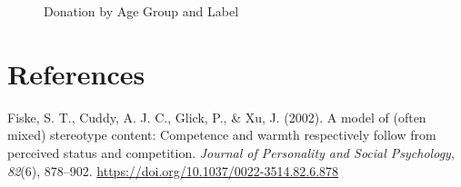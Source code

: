 \documentclass[
  man,
  floatsintext,
  longtable,
  nolmodern,
  notxfonts,
  notimes,
  colorlinks=true,linkcolor=blue,citecolor=blue,urlcolor=blue]{apa7}
\newlength{\cslhangindent}
\newenvironment{CSLReferences}[2] %
 {\begin{list}{}{%
  \setlength{\itemindent}{0pt}
  \setlength{\leftmargin}{0pt}
  \setlength{\parsep}{0pt}
  \ifodd #1
   \setlength{\leftmargin}{\cslhangindent}
   \setlength{\itemindent}{-1\cslhangindent}
  \fi
  \setlength{\itemsep}{#2\baselineskip}}}
 {\end{list}}
\begin{document}
\begin{figure}

\caption{\label{fig-donate-age-by-label}Donation by Age Group and Label}


\end{figure}%

\newpage

\section{References}\label{references}

\label{refs}
\begin{CSLReferences}{1}{0}
Fiske, S. T., Cuddy, A. J. C., Glick, P., \& Xu, J. (2002). A model of
(often mixed) stereotype content: {Competence} and warmth respectively
follow from perceived status and competition. \emph{Journal of
Personality and Social Psychology}, \emph{82}(6), 878--902.
\url{https://doi.org/10.1037/0022-3514.82.6.878}

\end{CSLReferences}
\end{document}
